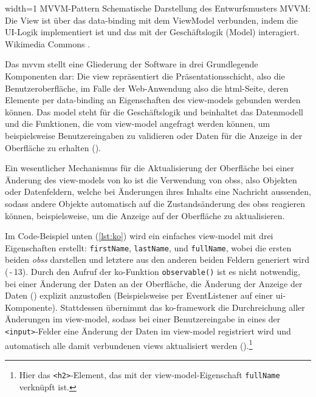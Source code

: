 	{width=1\textwidth}
	{MVVM-Pattern}
		{Schematische Darstellung des Entwurfsmusters MVVM: Die View ist über das \gls{data-binding} mit dem ViewModel verbunden, indem die UI-Logik implementiert ist und das mit der Geschäftslogik (Model) interagiert.}
	{Wikimedia Commons \cite{MVVMPattern}.}

Das \gls{mvvm} stellt eine Gliederung der Software in drei Grundlegende Komponenten dar:
Die \gls{view} repräsentiert die Präsentationsschicht, also die Benutzeroberfläche, im Falle der Web-Anwendung also die \gls{html}-Seite, deren Elemente per \gls{data-binding} an Eigenschaften des \glspl{view-model} gebunden werden können. 
Das \gls{model} steht für die Geschäftslogik und beinhaltet das Datenmodell und die Funktionen, die vom \gls{view-model} angefragt werden können, um beispielsweise Benutzereingaben zu validieren oder Daten für die Anzeige in der Oberfläche zu erhalten ().

Ein wesentlicher Mechanismus für die Aktualisierung der Oberfläche bei einer Änderung des \glspl{view-model} von \gls{ko} ist die Verwendung von \glspl{obs}, also Objekten oder Datenfeldern, welche bei Änderungen ihres Inhalts eine Nachricht aussenden, sodass andere Objekte automatisch auf die Zustandsänderung des \glspl{obs} reagieren können, beispielsweise, um die Anzeige auf der Oberfläche zu aktualisieren.

Im Code-Beispiel unten (\autoref{lst:ko}) wird ein einfaches \gls{view-model} mit drei Eigenschaften erstellt: \lstinline|firstName|, \lstinline|lastName|, und \lstinline|fullName|, wobei die ersten beiden \emph{\glspl{obs}} darstellen und letztere aus den anderen beiden Feldern generiert wird (\,-\,13).
Durch den Aufruf der \gls{ko}-Funktion \lstinline|observable()| ist es nicht notwendig, bei einer Änderung der Daten an der Oberfläche, die Änderung der Anzeige der Daten () explizit anzustoßen (Beispielsweise per EventListener auf einer \gls{ui}-Komponente).
Stattdessen übernimmt das \gls{ko}-\gls{framework} die Durchreichung aller Änderungen im \gls{view-model}, sodass bei einer Benutzereingabe in eines der \lstinline|<input>|-Felder eine Änderung der Daten im \gls{view-model} registriert wird und automatisch alle damit verbundenen \glspl{view} aktualisiert werden ().\footnote{Hier das \texttt{<h2>}-Element, das mit der \gls{view-model}-Eigenschaft \texttt{fullName} verknüpft ist.}


